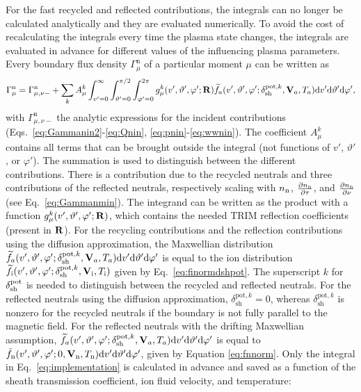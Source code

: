 For the fast recycled and reflected contributions, the integrals can no longer be calculated analytically and they are evaluated numerically. To avoid the cost of recalculating the integrals every time the plasma state changes, the integrals are evaluated in advance for different values of the influencing plasma parameters. Every boundary flux density $\Gamma_{\mu}^{\mathrm{n}}$ of a particular moment $\mu$ can be written as
\begin{equation}
\Gamma_{\mu}^{\mathrm{n}} = \Gamma_{\mu,\nu-}^{\mathrm{n}} + \sum_{k}A_{\mu}^{k} \int_{v'=0}^{\infty} \int_{\vartheta'=0}^{\pi/2} \int_{\varphi'=0}^{2\pi} g_{\mu}^{k}(v',\vartheta',\varphi';{\bf R}) \widetilde{f}_{a}(v',\vartheta',\varphi';\delta_{\mathrm{sh}}^{\mathrm{pot},k},\mathbf{V}_a,T_a) \mathrm{d} v'\mathrm{d} \vartheta' \mathrm{d} \varphi', \label{eq:implementation}
\end{equation}
with $\Gamma_{\mu,\nu-}^{\mathrm{n}}$ the analytic expressions for the incident contributions (Eqs.~\eqref{eq:Gammanin2}-\eqref{eq:Qnin}, \eqref{eq:pnin}-\eqref{eq:wwnin}). The coefficient $A_{\mu}^{k}$ contains all terms that can be brought outside the integral (not functions of $v'$, $\vartheta'$, or $\varphi'$). The summation is used to distinguish between the different contributions. There is a contribution due to the recycled neutrals and three contributions of the reflected neutrals, respectively scaling with $n_{\mathrm{n}}$, $\frac{\partial n_{\mathrm{n}}}{\partial \tau}$, and $\frac{\partial n_{\mathrm{n}}}{\partial \nu}$ (see Eq.~\eqref{eq:Gammanmin}). The integrand can be written as the product with a function $g_{\mu}^{k}(v',\vartheta',\varphi';{\bf R})$, which contains the needed TRIM reflection coefficients (present in ${\bf R}$). For the recycling contributions and the reflection contributions using the diffusion approximation, the Maxwellian distribution $\widetilde{f}_{a}(v',\vartheta',\varphi';\delta_{\mathrm{sh}}^{\mathrm{pot},k},\mathbf{V}_a,T_a) \mathrm{d} v'\mathrm{d} \vartheta' \mathrm{d} \varphi'$ is equal to the ion distribution $\widetilde{f}_{\mathrm{i}}(v',\vartheta',\varphi';\delta_{\mathrm{sh}}^{\mathrm{pot},k},{\bf V}_{\mathrm{i}},T_{\mathrm{i}})$ given by Eq.~\eqref{eq:finormdshpot}. The superscript $k$ for $\delta_{\mathrm{sh}}^{\mathrm{pot}}$ is needed to distinguish between the recycled and reflected neutrals. For the reflected neutrals using the diffusion approximation, $\delta_{\mathrm{sh}}^{\mathrm{pot},k} = 0$, whereas $\delta_{\mathrm{sh}}^{\mathrm{pot},k}$ is nonzero for the recycled neutrals if the boundary is not fully parallel to the magnetic field. For the reflected neutrals with the drifting Maxwellian assumption, $\widetilde{f}_{a}(v',\vartheta',\varphi';\delta_{\mathrm{sh}}^{\mathrm{pot},k},\mathbf{V}_a,T_a) \mathrm{d} v'\mathrm{d} \vartheta' \mathrm{d} \varphi'$ is equal to $\tilde{f}_\mathrm{n}(v',\vartheta',\varphi';0,\mathbf{V}_\mathrm{n},T_{\mathrm{n}}) \mathrm{d} v'\mathrm{d} \vartheta' \mathrm{d} \varphi'$, given by Equation \eqref{eq:fnnorm}. Only the integral in Eq.~\eqref{eq:implementation} is calculated in advance and saved as a function of the sheath transmission coefficient, ion fluid velocity, and temperature:
